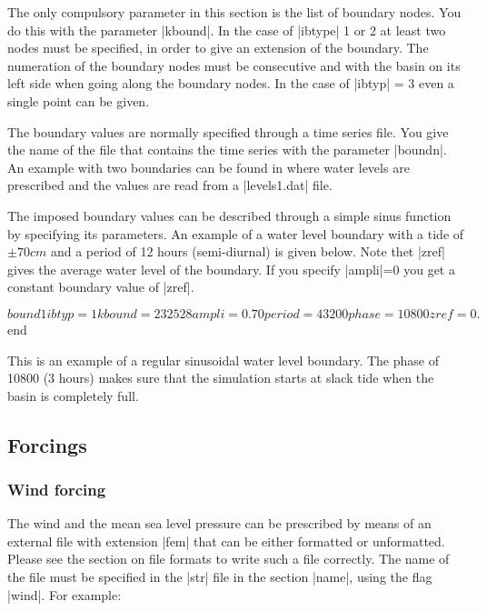The only compulsory parameter in this section is the list of boundary
nodes.  You do this with the parameter |kbound|.
In the case of |ibtype| 1 or 2 at least two nodes must be
specified, in order to give an extension of the boundary. The numeration
of the boundary nodes must be consecutive and with the basin on its
left side when going along the boundary nodes.  In the case of |ibtyp|
= 3 even a single point can be given.

The boundary values are normally specified through a time series file.
You give the name of the file that contains
the time series with the parameter |boundn|.
An example with two boundaries can be found
 in \Fig{} where water levels are prescribed and
the values are read from a |levels1.dat| file.

The imposed boundary values can be described through a simple sinus function by specifying  its parameters.
 An example of a water level boundary with a tide of
$\pm 70 cm$ and a period of 12 hours (semi-diurnal) is given below. Note thet |zref| gives the average water level of the
boundary. If you specify |ampli|=0 you get a constant boundary value
of |zref|.

\begin{code}
$bound1
      ibtyp = 1   kbound = 23 25 28
      ampli = 0.70  period = 43200  phase = 10800  zref = 0.
$end
\end{code}
This is an example of a regular sinusoidal water level boundary.
The phase of 10800 (3 hours) makes sure that the simulation starts at
slack tide when the basin is completely full.

\subsection{Forcings}

\subsubsection{Wind forcing}
The wind and the mean sea level pressure can be prescribed by means of an external
 file with extension |fem| that can be either formatted or unformatted.
 Please see the section on file formats to write such a
file correctly.  The name of the file must be specified in the |str|
file in the section |name|, using the flag |wind|. For example:


